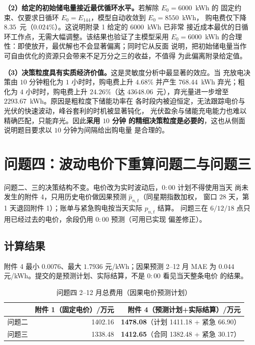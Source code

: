 \documentclass[withoutpreface,bwprint]{cumcmthesis}
\begin{document}
\textbf{（2）给定的初始储电量接近最优循环水平。}若解除 $E_0 = 6000$~kWh 的
固定约束、仅要求日循环 $E_0 = E_{144}$，模型自动收敛到 $E_0 = 8550$~kWh，
购电费仅下降 $8.35$~元（$0.024\%$）。这说明附录 1 给定的 $6000$~kWh 已非常
接近成本最优的日循环工作点，无需大幅调整。该结果也验证了主模型采用
$E_0 = 6000$~kWh 的合理性：即使放开，最优解也不会显著偏离；同时它从反面
说明，把初始储电量当作可自由优化的资源只会带来不足万分之三的收益，不值得
为此偏离附录给定值。

\textbf{（3）决策粒度具有实质经济价值。}这是灵敏度分析中最显著的效应。当
充放电决策由 $10$ 分钟粗化为 $1$ 小时时，购电费上升 $4.68\%$ 并产生
$768.44$~kWh 弃光；粗化为 $4$ 小时时，购电费上升 $24.26\%$（达
$43648.06$~元），弃光量进一步增至 $2293.67$~kWh。原因是粗粒度下储能功率在
各时段内被迫恒定，无法跟踪电价与光伏的快速波动，峰谷套利的时机被显著钝化，
光伏盈余与储能充电能力也难以精确匹配，只能弃光。因此\textbf{采用 $10$ 分钟
的精细决策粒度是必要的}，这也从侧面说明题目要求以 $10$ 分钟为间隔给出购电量
是合理的。

\section{问题四：波动电价下重算问题二与问题三}

问题二、三的决策结构不变。电价改为实时波动后，$0{:}00$ 计划不得使用当天
尚未发生的附件 4，只用历史电价做因果预测 $\hat p_{n,t}$（同星期指数加权，
窗口 $28$ 天，第 1 天退回附件 1）；账单与紧急购电按当天实际 $p_{n,t}$ 结算。
问题三在 $6/12/18$ 点只用已经过去的电价，余段仍用 $0{:}00$ 预测（可用已实现
偏差修正）。

\subsection{计算结果}

附件 4 最小 $0.0076$、最大 $1.7936$ 元/kWh；因果预测 2--12 月 MAE 为
$0.044$ 元/kWh。提交的是预测计划、实际结算，不是 $0{:}00$ 看见当天整条电价
的结果。

\begin{table}[H]
  \centering
  \caption{问题四 2--12 月总费用（因果电价预测计划）}
  \label{tab:p4-compare}
  \footnotesize
  \begin{tabular}{lrr}
    \toprule
     & 附件 1（固定电价）/万元 & 附件 4（预测计划+实际结算）/万元 \\
    \midrule
    问题二 & 1402.16 & \textbf{1478.08}（计划 1411.18 + 紧急 66.90） \\
    问题三 & 1338.48 & \textbf{1412.65}（合同 1382.48 + 紧急 30.17） \\
    \bottomrule
  \end{tabular}
\end{table}
\end{document}
